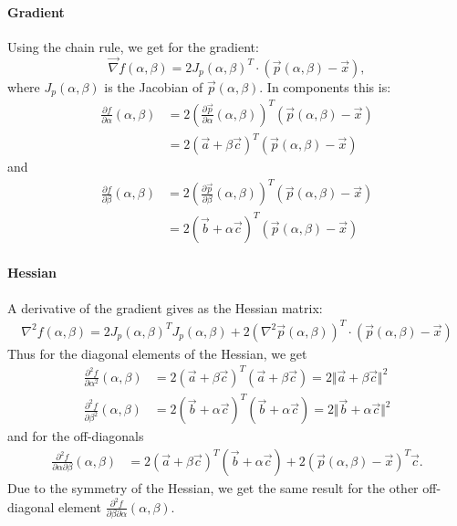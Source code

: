 \paragraph{Gradient}
Using the chain rule, we get for the gradient:
\begin{equation}
\vec \nabla f(\alpha, \beta) = 2 J_p (\alpha, \beta)^T \cdot (\vec p(\alpha, \beta) - \vec x),
\end{equation}
where $J_p (\alpha, \beta)$ is the Jacobian of $\vec p(\alpha, \beta)$. In components this is:
\begin{align}
\frac {\partial f} {\partial \alpha}(\alpha, \beta) &= 2 \left(\frac{\partial \vec p}{\partial \alpha}(\alpha, \beta)\right)^T (\vec p(\alpha, \beta) - \vec x) \nonumber\\
&= 2\left( \vec a + \beta \vec c \right)^T (\vec p(\alpha, \beta) - \vec x) 
\end{align}
and
\begin{align}
\frac {\partial f} {\partial \beta}(\alpha, \beta) &= 2 \left(\frac{\partial \vec p}{\partial \beta}(\alpha, \beta)\right)^T (\vec p(\alpha, \beta) - \vec x) \nonumber\\
&= 2\left( \vec b + \alpha \vec c \right)^T (\vec p(\alpha, \beta) - \vec x) 
\end{align}

\paragraph{Hessian}
A derivative of the gradient gives as the Hessian matrix:
\begin{align}
\nabla^2 f(\alpha, \beta) = 2 J_p (\alpha, \beta)^T J_p (\alpha, \beta) + 2 (\nabla^2 \vec p (\alpha, \beta))^T \cdot (\vec p(\alpha, \beta) - \vec x)
\end{align}
Thus for the diagonal elements of the Hessian, we get
\begin{align}
\frac {\partial^2 f} {\partial \alpha^2}(\alpha, \beta) &= 2(\vec a + \beta \vec c)^T(\vec a + \beta \vec c) = 2 \Vert \vec a + \beta \vec c \Vert^2 \\
\frac {\partial^2 f} {\partial \beta^2}(\alpha, \beta) &= 2(\vec b + \alpha \vec c)^T(\vec b + \alpha \vec c) = 2 \Vert \vec b + \alpha \vec c \Vert^2 
\end{align}
and for the off-diagonals
\begin{align}
\frac {\partial^2 f} {\partial \alpha \partial  \beta}(\alpha, \beta) 
&= 2(\vec a + \beta \vec c)^T(\vec b + \alpha \vec c) + 2(\vec p (\alpha, \beta) - \vec x)^T \vec c.
\end{align}
Due to the symmetry of the Hessian, we get the same result for the other off-diagonal element $\frac {\partial^2 f} {\partial \beta \partial  \alpha}(\alpha, \beta)$.